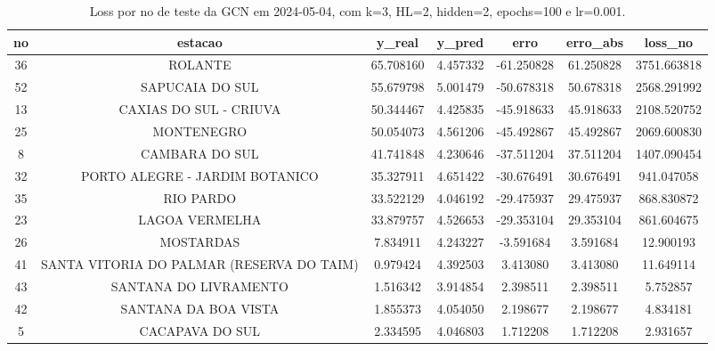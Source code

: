 \begin{table}[h]
\centering
\caption{Loss por no de teste da GCN em 2024-05-04, com k=3, HL=2, hidden=2, epochs=100 e lr=0.001.}
\label{tab:gcn_loss_k3_hl2_h2_e100_d20240504}
\begin{tabular}{ccccccc}
\toprule
no & estacao & y\_real & y\_pred & erro & erro\_abs & loss\_no \\
\midrule
36 & ROLANTE & 65.708160 & 4.457332 & -61.250828 & 61.250828 & 3751.663818 \\
52 & SAPUCAIA DO SUL & 55.679798 & 5.001479 & -50.678318 & 50.678318 & 2568.291992 \\
13 & CAXIAS DO SUL - CRIUVA & 50.344467 & 4.425835 & -45.918633 & 45.918633 & 2108.520752 \\
25 & MONTENEGRO & 50.054073 & 4.561206 & -45.492867 & 45.492867 & 2069.600830 \\
8 & CAMBARA DO SUL & 41.741848 & 4.230646 & -37.511204 & 37.511204 & 1407.090454 \\
32 & PORTO ALEGRE - JARDIM BOTANICO & 35.327911 & 4.651422 & -30.676491 & 30.676491 & 941.047058 \\
35 & RIO PARDO & 33.522129 & 4.046192 & -29.475937 & 29.475937 & 868.830872 \\
23 & LAGOA VERMELHA & 33.879757 & 4.526653 & -29.353104 & 29.353104 & 861.604675 \\
26 & MOSTARDAS & 7.834911 & 4.243227 & -3.591684 & 3.591684 & 12.900193 \\
41 & SANTA VITORIA DO PALMAR (RESERVA DO TAIM) & 0.979424 & 4.392503 & 3.413080 & 3.413080 & 11.649114 \\
43 & SANTANA DO LIVRAMENTO & 1.516342 & 3.914854 & 2.398511 & 2.398511 & 5.752857 \\
42 & SANTANA DA BOA VISTA & 1.855373 & 4.054050 & 2.198677 & 2.198677 & 4.834181 \\
5 & CACAPAVA DO SUL & 2.334595 & 4.046803 & 1.712208 & 1.712208 & 2.931657 \\
\bottomrule
\end{tabular}
\end{table}
